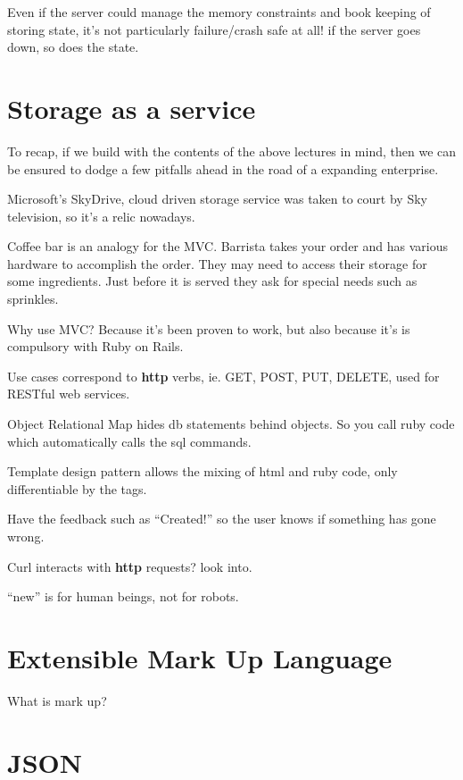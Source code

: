 \documentclass[11pt]{article}
\begin{document}
Even if the server could manage the memory constraints and book keeping of storing state, it’s not particularly failure/crash safe at all! if the server goes down, so does the state.


\section{Storage as a service}

To recap, if we build with the contents of the above lectures in mind, then we can be ensured to dodge a few pitfalls ahead in the road of a expanding enterprise.

Microsoft’s SkyDrive, cloud driven storage service was taken to court by Sky television, so it’s a relic nowadays.

Coffee bar is an analogy for the MVC. Barrista takes your order and has various hardware to accomplish the order. They may need to access their storage for some ingredients. Just before it is served they ask for special needs such as sprinkles.

Why use MVC? Because it’s been proven to work, but also because it’s is compulsory with Ruby on Rails.

Use cases correspond to \textbf{http} verbs, ie. GET, POST, PUT, DELETE, used for RESTful web services.

Object Relational Map hides db statements behind objects. So you call ruby code which automatically calls the sql commands.

Template design pattern allows the mixing of html and ruby code, only differentiable by the tags.

Have the feedback such as “Created!” so the user knows if something has gone wrong.

Curl interacts with \textbf{http} requests? look into.

“new” is for human beings, not for robots.


\section{Extensible Mark Up Language}
\label{sec:XML}

What is mark up?


\section{JSON}
\end{document}
